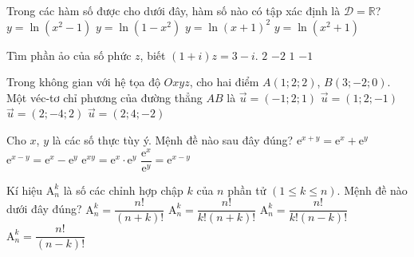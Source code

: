 \begin{ex}%
Trong các hàm số được cho dưới đây, hàm số nào có tập xác định là $\mathscr D=\mathbb{R}$?
\choice
{$y=\ln (x^2-1)$}
{$y=\ln (1-x^2)$}
{$y=\ln (x+1)^2$}
{\True $y=\ln (x^2+1)$}
\end{ex}

\begin{ex}%
Tìm phần ảo của số phức $z$, biết $(1+i)z=3-i$.
\choice
{$2$}
{\True $-2$}
{$1$}
{$-1$}
\end{ex}

\begin{ex}%
Trong không gian với hệ tọa độ $Oxyz$, cho hai điểm $A(1;2;2)$, $B(3;-2;0)$. Một véc-tơ chỉ phương của đường thẳng $AB$ là
\choice
{\True $\overrightarrow{u}=(-1;2;1)$}
{$\overrightarrow{u}=(1;2;-1)$}
{$\overrightarrow{u}=(2;-4;2)$}
{$\overrightarrow{u}=(2;4;-2)$}
\end{ex}

\begin{ex}%
Cho $x$, $y$ là các số thực tùy ý. Mệnh đề nào sau đây đúng?
\choice
{$\mathrm{e}^{x+y}=\mathrm{e}^x+\mathrm{e}^y$}
{$\mathrm{e}^{x-y}=\mathrm{e}^x-\mathrm{e}^y$}
{$\mathrm{e}^{xy}=\mathrm{e}^x\cdot\mathrm{e}^y$}
{\True $\dfrac{\mathrm{e}^x}{\mathrm{e}^y}=\mathrm{e}^{x-y}$}
\end{ex}

\begin{ex}%
Kí hiệu $\mathrm{A}_n^k$ là số các chỉnh hợp chập $k$ của $n$ phần tử $(1\le k\le n)$. Mệnh đề nào dưới đây đúng?
\choice
{$\mathrm{A}_n^k=\dfrac{n!}{(n+k)!}$}
{$\mathrm{A}_n^k=\dfrac{n!}{k!(n+k)!}$}
{$\mathrm{A}_n^k=\dfrac{n!}{k!(n-k)!}$}
{\True $\mathrm{A}_n^k=\dfrac{n!}{(n-k)!}$}
\end{ex}

